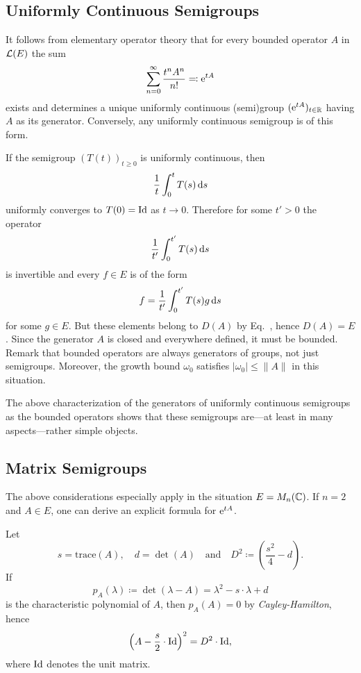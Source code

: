 \subsection{Uniformly Continuous Semigroups}\label{subsec:a1-2.1}%
It follows from elementary operator theory that for every bounded operator $A$ in  $\mathcal{L}(E)$ the sum
\[
    \sum_{n=0}^{\infty} \frac{t^{n}A^{n}}{n!} \eqqcolon \mathrm{e}^{tA}
\]
exists and determines a unique uniformly continuous (semi)group $( \mathrm{e}^{tA})_{t \in \mathbb{R}}$ having $A$ as its generator.
Conversely, any uniformly continuous semigroup is of this form.

If the semigroup $(T(t))_{t \geq 0}$ is uniformly continuous, then 
%
\[
	\frac{1}{t}\int_{0}^{t} T(s) \mathop{}\!\mathrm{d}{s}
\]
%
uniformly converges to $T(0)=\operatorname{Id}$ as $t \to 0$.
Therefore for some $t' > 0$ the ope\-rator 
%
\[
	\frac{1}{t'}\int_{0}^{t'} T(s) \mathop{}\!\mathrm{d}{s}
\]
%
is invertible and every $f \in E$ is of the form 
%
\[
	f = \frac{1}{t'}\int_{0}^{t'} T(s)g \mathop{}\!\mathrm{d}{s}
\]
%
for some $g \in E$.
But these elements belong to $D(A)$ by Eq.~, hence $D(A) = E$.
Since the generator $A$ is closed and everywhere defined, it must be bounded.
Remark that bounded operators are always generators of groups, not just semigroups.
Moreover, the growth bound $\omega_0$ satisfies $|\omega_0| \leq \|A\|$ in this situation.

The above characterization of the generators of uniformly continuous semigroups as the bounded operators shows that these semigroups are---at least in many aspects---rather simple objects.
\subsection{Matrix Semigroups}\label{subsec:a1-2.2}%
The above considerations especially apply in the situation $E = M_{n}(\mathbb{C})$.
If\/ $n = 2$ and $A \in E$, one can derive an explicit formula for $ \mathrm{e}^{tA}$. 

Let %
\[
	s = \text{trace}(A), 
	\quad 
	d = \det(A) 
	\quad \text{and} \quad
	D^{2} \coloneq \left( \frac{s^{2}}{4} - d \right).
\]
%
If   
\[
p_A(\lambda) \coloneq \det(\lambda - A) = \lambda^2-s\cdot \lambda + d 
\]
is the characteristic polynomial  of\/ $ A $, then $ p_{A}(A) = 0 $ by \emph{Cayley-Hamilton}, hence
%
\[
	\left( A - \frac{s}{2} \cdot \operatorname{Id} \right)^{2} = D^{2} \cdot \operatorname{Id} , 
\]
%
where $ \operatorname{Id} $ denotes the unit matrix.

